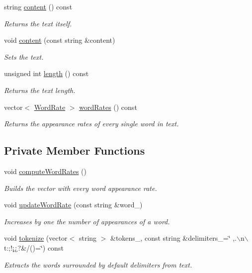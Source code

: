 \begin{CompactItemize}
string \hyperlink{class_text_8a29bbf6c707ac8b2055a22723a82f3d}{content} () const 
\begin{CompactList}\small\item\em Returns the text itself. \item\end{CompactList}\item 
void \hyperlink{class_text_6be01035a20918e8c242ae310ff81bed}{content} (const string \&content)
\begin{CompactList}\small\item\em Sets the text. \item\end{CompactList}\item 
unsigned int \hyperlink{class_text_8d76db538f8617fb8880ba3e4ff3e6a5}{length} () const 
\begin{CompactList}\small\item\em Returns the text length. \item\end{CompactList}\item 
vector$<$ \hyperlink{_word_rate_8h_e8f43926daba5798edbb3cb94ad07ff7}{WordRate} $>$ \hyperlink{class_text_1c69ff1b2a6b1bfbf0b44fc4a185de3d}{wordRates} () const 
\begin{CompactList}\small\item\em Returns the appearance rates of every single word in text. \item\end{CompactList}\end{CompactItemize}
\subsection*{Private Member Functions}
\begin{CompactItemize}
\item 
void \hyperlink{class_text_8239e13039bcc1c713f66f1236693706}{computeWordRates} ()
\begin{CompactList}\small\item\em Builds the vector with every word appearance rate. \item\end{CompactList}\item 
void \hyperlink{class_text_f6d05ed37e647935127fdf4f36eaca43}{updateWordRate} (const string \&word\_\-)
\begin{CompactList}\small\item\em Increases by one the number of appearances of a word. \item\end{CompactList}\item 
void \hyperlink{class_text_09f6b1e475da423ac81305500e05c7d6}{tokenize} (vector$<$ string $>$ \&tokens\_\-, const string \&delimiters\_\-=\char`\"{} ,.$\backslash$n$\backslash$t:;!¡¿?\&/()=\char`\"{}) const 
\begin{CompactList}\small\item\em Extracts the words surrounded by default delimiters from text. \item\end{CompactList}\end{CompactItemize}
